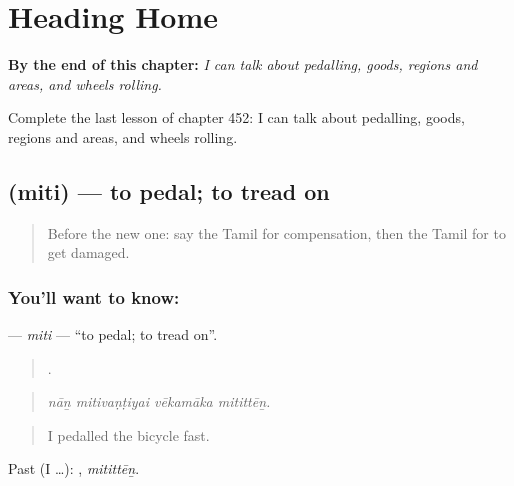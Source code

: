 
\chapter{Heading Home}
\label{ch:ta-heading-home}

\begin{chapteropening}
\textbf{By the end of this chapter:} \emph{I can talk about pedalling, goods, regions and areas, and wheels rolling.}

Complete the last lesson of chapter 452: I can talk about pedalling, goods, regions and areas, and wheels rolling.
\end{chapteropening}

\section[\texorpdfstring{\ta{மிதி} (miti)}{மிதி (miti)}]{ (miti) — to pedal; to tread on}

\label{lesson:TA-C452-miti-pedal}



\begin{quote}
Before the new one: say the Tamil for compensation, then the Tamil for to get damaged.
\end{quote}

\subsection*{You'll want to know: }
\textbf{} — \emph{miti} — \textquotedblleft{}to pedal; to tread on\textquotedblright{}.

\begin{quote}
   .
\end{quote}

\begin{quote}
\emph{nāṉ mitivaṇṭiyai vēkamāka mitittēṉ.}
\end{quote}

\begin{quote}
I pedalled the bicycle fast.
\end{quote}

Past (I …): , \emph{mitittēṉ}.

